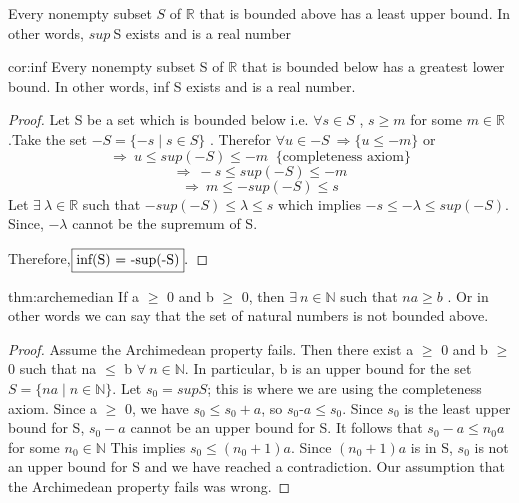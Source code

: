 \documentclass{notes}
\begin{document}
\begin{definition}{}
		Every nonempty subset $S$ of $\mathbb{R}$ that is bounded above has a least upper bound. In other words, $sup\ $S exists and is a real number
\end{definition}
\begin{corollary}{cor:inf}
	Every nonempty subset S of $\mathbb{R}$ that is bounded below has a greatest lower bound. In other words, inf S exists and is a real number.
	
\end{corollary}
\begin{proof}
	Let S be a set which is bounded below i.e. $\forall s \in S$ ,  $s \geq m$ for some $m \in \mathbb{R}$ .Take the set $ - S = \{ - s\mid s \in S\}$ .
	Therefor $ \forall u \in - S\ \Rightarrow \{u\leq - m\} $ or 
	$$ \Rightarrow\ u\leq sup(- S) \leq - m\ \text{ \{completeness axiom\}}$$
	$$\Rightarrow\ - s \leq sup(- S) \leq - m   $$
	$$ \Rightarrow\ m \leq - sup(- S) \leq s $$
	Let $ \exists\ \lambda \in \mathbb{R}$ such that $-sup(- S) \leq \lambda \leq  s$ which implies $- s \leq - \lambda \leq sup(- S) $. Since, $ - \lambda $ cannot be the supremum of S. 
	
	Therefore,$\framebox{inf(S) = -sup(-S)} .$
	
\end{proof}
\begin{theorem}{thm:archemedian}
	If a $\geq$ 0 and b $\geq$ 0, then $\exists \ n\in \mathbb{N} $ such that $n a \geq b$ . Or in other words we can say that the set of natural numbers is not bounded above.
\end{theorem}
\begin{proof}
	
	Assume the Archimedean property fails. Then there exist a $\geq$ 0 and 
	b  $\geq$ 0 such that na  $\leq$ b $\forall\ n \in \mathbb{N}$. In particular, b is an upper
	bound for the set $S= \{ na \mid n \in \mathbb{N} \}$. Let $s_0 = sup S$; this is where we
	are using the completeness axiom. Since a $\geq$ 0, we have $s_0 \leq s_0 + a$,
	so $s_0 $-$ a\leq s_0$.  Since
	$s_0$ is the least upper bound for S, $s_0-a$ cannot be an upper bound
	for S. It follows that $s_0 - a\leq n_0a$ for some $n_0 \in \mathbb{N}$ This implies
	$s_0 \leq (n_0 + 1)a$. Since $(n_0 + 1)a$ is in S, $s_0$ is not an upper bound
	for S and we have reached a contradiction. Our 
	assumption that the
	Archimedean property fails was wrong.
\end{proof}
\end{document}
